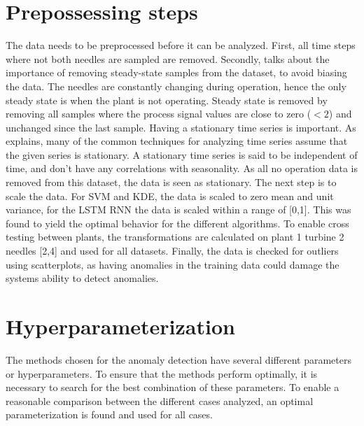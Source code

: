         
        
    \section{Prepossessing steps}
        The data needs to be preprocessed before it can be analyzed. First, all time steps where not both needles are sampled are removed. Secondly, \cite{Tarassenko2009} talks about the importance of removing steady-state samples from the dataset, to avoid biasing the data.  The needles are constantly changing during operation, hence the only steady state is when the plant is not operating. Steady state is removed by removing all samples where the process signal values are close to zero ($<2$) and unchanged since the last sample. Having a stationary time series is important. As \cite{Manuca1996} explains, many of the common techniques for analyzing time series assume that the given series is stationary. A stationary time series is said to be independent of time, and don't have any correlations with seasonality. As all no operation data is removed from this dataset, the data is seen as stationary. The next step is to scale the data. For SVM and KDE, the data is scaled to zero mean and unit variance, for the LSTM RNN the data is scaled within a range of [0,1]. This was found to yield the optimal behavior for the different algorithms. To enable cross testing between plants, the transformations are calculated on plant 1 turbine 2 needles [2,4] and used for all datasets. Finally, the data is checked for outliers using scatterplots, as having anomalies in the training data could damage the systems ability to detect anomalies. 
    
    \section{Hyperparameterization}
        The methods chosen for the anomaly detection have several different parameters or hyperparameters. To ensure that the methods perform optimally, it is necessary to search for the best combination of these parameters. To enable a reasonable comparison between the different cases analyzed, an optimal parameterization is found and used for all cases. 
